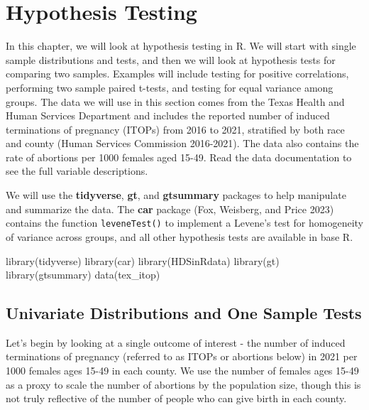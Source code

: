 \documentclass[
  letterpaper,
]{krantz}
\makeatletter
\newenvironment{Shaded}{\begin{snugshade}}{\end{snugshade}}
\newcommand{\FunctionTok}[1]{\textcolor[rgb]{0.28,0.35,0.67}{#1}}
\newcommand{\NormalTok}[1]{\textcolor[rgb]{0.00,0.23,0.31}{#1}}
\newenvironment{kframe}{%
\medskip{}
\setlength{\fboxsep}{.8em}
 \def\at@end@of@kframe{}%
 \ifinner\ifhmode%
  \def\at@end@of@kframe{\end{minipage}}%
  \begin{minipage}{\columnwidth}%
 \fi\fi%
 \def\FrameCommand##1{\hskip\@totalleftmargin \hskip-\fboxsep
 \colorbox{shadecolor}{##1}\hskip-\fboxsep
     \hskip-\linewidth \hskip-\@totalleftmargin \hskip\columnwidth}%
 \MakeFramed {\advance\hsize-\width
   \@totalleftmargin\z@ \linewidth\hsize
   \@setminipage}}%
 {\par\unskip\endMakeFramed%
 \at@end@of@kframe}
\renewenvironment{Shaded}{\begin{kframe}}{\end{kframe}}
\makeatother
\begin{document}

\hypertarget{sec-hypothesis-testing}{%
\chapter{Hypothesis Testing}\label{sec-hypothesis-testing}}

In this chapter, we will look at hypothesis testing in R. We will start
with single sample distributions and tests, and then we will look at
hypothesis tests for comparing two samples. Examples will include
testing for positive correlations, performing two sample paired t-tests,
and testing for equal variance among groups. The data we will use in
this section comes from the Texas Health and Human Services Department
and includes the reported number of induced terminations of pregnancy
(ITOPs) from 2016 to 2021, stratified by both race and county (Human
Services Commission 2016-2021). The data also contains the rate of
abortions per 1000 females aged 15-49. Read the data documentation to
see the full variable descriptions.

We will use the \textbf{tidyverse}, \textbf{gt}, and \textbf{gtsummary}
packages to help manipulate and summarize the data. The \textbf{car}
package (Fox, Weisberg, and Price 2023) contains the function
\texttt{leveneTest()} to implement a Levene's test for homogeneity of
variance across groups, and all other hypothesis tests are available in
base R.

\begin{Shaded}
\begin{Highlighting}[]
\FunctionTok{library}\NormalTok{(tidyverse)}
\FunctionTok{library}\NormalTok{(car)}
\FunctionTok{library}\NormalTok{(HDSinRdata)}
\FunctionTok{library}\NormalTok{(gt)}
\FunctionTok{library}\NormalTok{(gtsummary)}
\FunctionTok{data}\NormalTok{(tex\_itop)}
\end{Highlighting}
\end{Shaded}

\hypertarget{univariate-distributions-and-one-sample-tests}{%
\section{Univariate Distributions and One Sample
Tests}\label{univariate-distributions-and-one-sample-tests}}

Let's begin by looking at a single outcome of interest - the number of
induced terminations of pregnancy (referred to as ITOPs or abortions
below) in 2021 per 1000 females ages 15-49 in each county. We use the
number of females ages 15-49 as a proxy to scale the number of abortions
by the population size, though this is not truly reflective of the
number of people who can give birth in each county.
\end{document}
